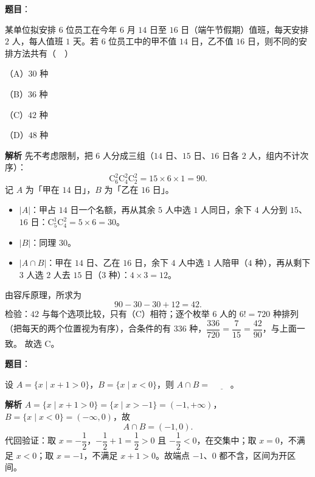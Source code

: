\begin{answer}

\textbf{题目}：

某单位拟安排 $6$ 位员工在今年 $6$ 月 $14$ 日至 $16$ 日（端午节假期）值班，每天安排 $2$ 人，每人值班 $1$ 天。若 $6$ 位员工中的甲不值 $14$ 日，乙不值 $16$ 日，则不同的安排方法共有（　）

（A）$30$ 种

（B）$36$ 种

（C）$42$ 种

（D）$48$ 种

\textbf{解析}
先不考虑限制，把 $6$ 人分成三组（$14$ 日、$15$ 日、$16$ 日各 $2$ 人，组内不计次序）：
\nopagebreak[4]
\[\mathrm C_6^2\mathrm C_4^2\mathrm C_2^2=15\times6\times1=90.\]
记 $A$ 为「甲在 $14$ 日」，$B$ 为「乙在 $16$ 日」。
\begin{itemize}
\item $|A|$：甲占 $14$ 日一个名额，再从其余 $5$ 人中选 $1$ 人同日，余下 $4$ 人分到 $15$、$16$ 日：$\mathrm C_5^1\mathrm C_4^2=5\times6=30$。
\item $|B|$：同理 $30$。
\item $|A\cap B|$：甲在 $14$ 日、乙在 $16$ 日，余下 $4$ 人中选 $1$ 人陪甲（$4$ 种），再从剩下 $3$ 人选 $2$ 人去 $15$ 日（$3$ 种）：$4\times3=12$。
\end{itemize}

由容斥原理，所求为
\nopagebreak[4]
\[90-30-30+12=42.\]
检验：$42$ 与每个选项比较，只有（C）相符；逐个枚举 $6$ 人的 $6!=720$ 种排列（把每天的两个位置视为有序），合条件的有 $336$ 种，$\dfrac{336}{720}=\dfrac{7}{15}=\dfrac{42}{90}$，与上面一致。
故选 C。


\end{answer}
\begin{answer}

\textbf{题目}：

设 $A=\{x\mid x+1>0\}$，$B=\{x\mid x<0\}$，则 $A\cap B=$ $\underline{\qquad}$。

\textbf{解析}
$A=\{x\mid x+1>0\}=\{x\mid x>-1\}=(-1,+\infty)$，$B=\{x\mid x<0\}=(-\infty,0)$，故
\nopagebreak[4]
\[A\cap B=(-1,0).\]
代回验证：取 $x=-\dfrac12$，$-\dfrac12+1=\dfrac12>0$ 且 $-\dfrac12<0$，在交集中；取 $x=0$，不满足 $x<0$；取 $x=-1$，不满足 $x+1>0$。故端点 $-1$、$0$ 都不含，区间为开区间。


\end{answer}

